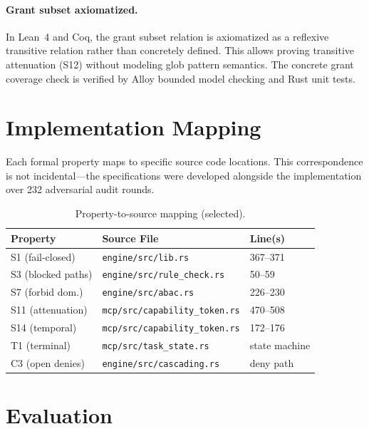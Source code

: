 \documentclass[sigplan,screen,nonacm]{acmart}
\begin{document}
\paragraph{Grant subset axiomatized.} In Lean~4 and Coq, the grant subset
relation is axiomatized as a reflexive transitive relation rather than
concretely defined. This allows proving transitive attenuation (S12) without
modeling glob pattern semantics. The concrete grant coverage check is verified
by Alloy bounded model checking and Rust unit tests.


\section{Implementation Mapping}
\label{sec:mapping}

Each formal property maps to specific source code locations. This
correspondence is not incidental---the specifications were developed
alongside the implementation over 232 adversarial audit rounds.

\begin{table}[h]
\caption{Property-to-source mapping (selected).}
\label{tab:mapping}
\small
\begin{tabular}{@{}lll@{}}
\toprule
Property & Source File & Line(s) \\
\midrule
S1 (fail-closed) & \texttt{engine/src/lib.rs} & 367--371 \\
S3 (blocked paths) & \texttt{engine/src/rule\_check.rs} & 50--59 \\
S7 (forbid dom.) & \texttt{engine/src/abac.rs} & 226--230 \\
S11 (attenuation) & \texttt{mcp/src/capability\_token.rs} & 470--508 \\
S14 (temporal) & \texttt{mcp/src/capability\_token.rs} & 172--176 \\
T1 (terminal) & \texttt{mcp/src/task\_state.rs} & state machine \\
C3 (open denies) & \texttt{engine/src/cascading.rs} & deny path \\
\bottomrule
\end{tabular}
\end{table}


\section{Evaluation}
\label{sec:eval}
\end{document}

